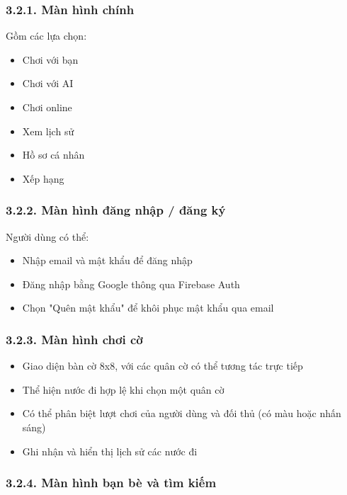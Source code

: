 \documentclass[a4paper,12pt]{article}
\begin{document}
\subsubsection*{3.2.1. Màn hình chính} %

\noindent Gồm các lựa chọn:
\begin{itemize}[label=·]
    \item Chơi với bạn
    \item Chơi với AI
    \item Chơi online
    \item Xem lịch sử
    \item Hồ sơ cá nhân
    \item Xếp hạng
\end{itemize}

\subsubsection*{3.2.2. Màn hình đăng nhập / đăng ký} %

\noindent Người dùng có thể:
\begin{itemize}[label=·]
    \item Nhập email và mật khẩu để đăng nhập
    \item Đăng nhập bằng Google thông qua Firebase Auth
    \item Chọn "Quên mật khẩu" để khôi phục mật khẩu qua email
\end{itemize}

\subsubsection*{3.2.3. Màn hình chơi cờ} %

\noindent \begin{itemize}[label=·]
    \item Giao diện bàn cờ 8x8, với các quân cờ có thể tương tác trực tiếp
    \item Thể hiện nước đi hợp lệ khi chọn một quân cờ
    \item Có thể phân biệt lượt chơi của người dùng và đối thủ (có màu hoặc nhấn sáng)
    \item Ghi nhận và hiển thị lịch sử các nước đi
\end{itemize}

\subsubsection*{3.2.4. Màn hình bạn bè và tìm kiếm} %
\end{document}
